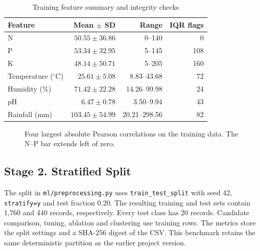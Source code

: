\documentclass[conference]{IEEEtran}
\begin{document}
\begin{table}[t]
\caption{Training feature summary and integrity checks}
\label{tab:data}
\centering\footnotesize
\begin{tabular}{@{}lrrr@{}}
\toprule
Feature & Mean $\pm$ SD & Range & IQR flags \\
\midrule
N & $50.55\pm36.86$ & 0--140 & 0 \\
P & $53.34\pm32.95$ & 5--145 & 108 \\
K & $48.14\pm50.71$ & 5--205 & 160 \\
Temperature ($^\circ$C) & $25.61\pm5.08$ & 8.83--43.68 & 72 \\
Humidity (\%) & $71.42\pm22.28$ & 14.26--99.98 & 24 \\
pH & $6.47\pm0.78$ & 3.50--9.94 & 43 \\
Rainfall (mm) & $103.45\pm54.99$ & 20.21--298.56 & 82 \\
\bottomrule
\end{tabular}
\end{table}

\begin{figure}[t]
\centering
{}
\caption{Four largest absolute Pearson correlations on the training data. The N--P bar extends left of zero.}
\label{fig:eda}
\end{figure}

\subsection{Stage 2. Stratified Split}
The split in \texttt{ml/preprocessing.py} uses \texttt{train\_test\_split} with seed 42, \texttt{stratify=y} and test fraction 0.20. The resulting training and test sets contain 1,760 and 440 records, respectively. Every test class has 20 records. Candidate comparison, tuning, ablation and clustering use training rows. The metrics store the split settings and a SHA-256 digest of the CSV. This benchmark retains the same deterministic partition as the earlier project version.
\end{document}
